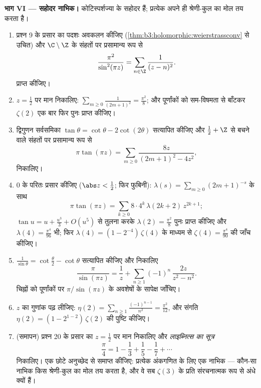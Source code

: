 \begin{problem}
\medskip
\noindent\textbf{भाग VI --- सहोदर नाभिक।} कोटिस्पर्शज्या के
सहोदर हैं; प्रत्येक अपने ही श्रेणी-कुल का मोल तय करता है।
\begin{enumerate}[resume]
  \item प्रश्न 9 के प्रसार का पदशः अवकलन कीजिए (\cref{thm:b3:holomorphic:weierstrassconv} से उचित)
        और $\C\setminus\Z$ के संहतों पर प्रसामान्य रूप से
        \[
        \frac{\pi^2}{\sin^2(\pi z)} =
        \sum_{n\in\Z}\frac1{(z - n)^2} .
        \]
        प्राप्त कीजिए।
  \item $z = \frac12$ पर मान निकालिए: $\sum_{m\geq0}\frac1{(2m+1)^2} = \frac{\pi^2}8$; और पूर्णांकों को सम-विषमता
        से बाँटकर $\zeta(2)$ एक बार फिर पुनः प्राप्त कीजिए।
  \item द्विगुणन सर्वसमिका $\tan\theta =
        \cot\theta - 2\cot(2\theta)$ सत्यापित कीजिए और $\frac12 + \Z$ से बचने
        वाले संहतों पर प्रसामान्य रूप से
        \[
        \pi\tan(\pi z) =
        \sum_{m\geq0}\frac{8z}{(2m+1)^2 - 4z^2} ,
        \]
        निकालिए।
  \item $0$ के परितः प्रसार कीजिए ($\abs z < \frac12$; फिर फुबिनी): $\lambda(s) =
        \sum_{m\geq0}(2m+1)^{-s}$
        के साथ
        \[
        \pi\tan(\pi z) =
        \sum_{k\geq0}8\cdot4^k\,\lambda(2k+2)\,z^{2k+1} ;
        \]
        $\tan u = u + \frac{u^3}3 + O(u^5)$ से तुलना करके $\lambda(2) = \frac{\pi^2}8$ पुनः प्राप्त कीजिए और $\lambda(4) = \frac{\pi^4}{96}$ भी;
        फिर $\lambda(4) = (1 -
        2^{-4})\,\zeta(4)$ के माध्यम से $\zeta(4) = \frac{\pi^4}{90}$ की जाँच कीजिए।
  \item $\frac1{\sin\theta} = \cot\frac\theta2 -
        \cot\theta$ सत्यापित कीजिए और निकालिए
        \[
        \frac{\pi}{\sin(\pi z)} = \frac1z +
        \sum_{n\geq1}(-1)^n\,\frac{2z}{z^2 - n^2} .
        \]
        चिह्नों को पूर्णांकों पर $\pi/\sin(\pi z)$ के अवशेषों के सापेक्ष
        जाँचिए।
  \item $z$ का गुणांक पढ़ लीजिए: $\eta(2) =
        \sum_{n\geq1}\frac{(-1)^{n-1}}{n^2} =
        \frac{\pi^2}{12}$, और संगति $\eta(2) = (1 - 2^{1-2})\,\zeta(2)$ की पुष्टि
        कीजिए।
  \item (समापन) प्रश्न 20 के प्रसार का $z =
        \frac12$ पर मान निकालिए और
        \emph{लाइब्नित्स का सूत्र}
        \[
        \frac\pi4 = 1 - \frac13 + \frac15 - \frac17 +
        \cdots
        \]
        निकालिए। एक छोटे अनुच्छेद से समाप्त कीजिए: प्रत्येक
        अंकगणित के लिए एक नाभिक --- कौन-सा नाभिक किस श्रेणी-कुल
        का मोल तय करता है, और वे सब $\zeta(3)$ के प्रति संरचनात्मक रूप
        से अंधे क्यों हैं।


\end{enumerate}
\end{problem}
